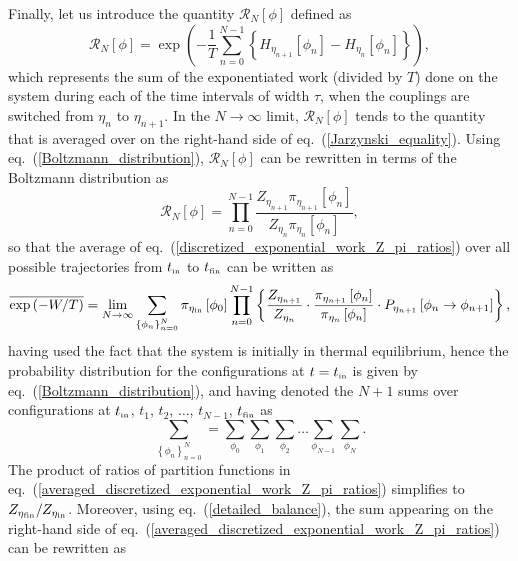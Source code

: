 \documentclass[11pt]{article}
\newcommand{\etain}{\eta_{\mbox{\tiny{in}}}}
\newcommand{\etafin}{\eta_{\mbox{\tiny{fin}}}}
\newcommand{\tin}{t_{\mbox{\tiny{in}}}}
\newcommand{\tfin}{t_{\mbox{\tiny{fin}}}}
\begin{document}
Finally, let us introduce the quantity $\mathcal{R}_N[\phi]$ defined as
\begin{equation}
\label{discretized_exponential_work}
\mathcal{R}_N[\phi] = \exp \left( - \frac{1}{T}\sum_{n=0}^{N-1} \left\{ H_{\eta_{n+1}}\left[\phi_n\right] - H_{\eta_n}\left[\phi_n\right] \right\}\right),
\end{equation}
which represents the sum of the exponentiated work (divided by $T$) done on the system during each of the time intervals of width $\tau$, when the couplings are switched from $\eta_n$ to $\eta_{n+1}$. In the $N \to \infty$ limit, $\mathcal{R}_N[\phi]$ tends to the quantity that is averaged over on the right-hand side of eq.~(\ref{Jarzynski_equality}). Using eq.~(\ref{Boltzmann_distribution}), $\mathcal{R}_N[\phi]$ can be rewritten in terms of the Boltzmann distribution as
\begin{equation}
\label{discretized_exponential_work_Z_pi_ratios}
\mathcal{R}_N[\phi] = \prod_{n=0}^{N-1} \frac{Z_{\eta_{n+1}} \pi_{\eta_{n+1}}\left[\phi_n \right]}{Z_{\eta_n} \pi_{\eta_n}\left[\phi_n \right]},
\end{equation}
so that the average of eq.~(\ref{discretized_exponential_work_Z_pi_ratios}) over all possible trajectories from $\tin$ to $\tfin$ can be written as
\begin{equation}
\label{averaged_discretized_exponential_work_Z_pi_ratios}
\overline{\exp \left( -W/T \right)} = \lim_{N \to \infty} \sum_{\left\{ \phi_n \right\}_{n=0}^N }\pi_{\etain}\left[ \phi_0 \right] \prod_{n=0}^{N-1} \left\{ \frac{Z_{\eta_{n+1}}}{Z_{\eta_n}} \cdot \frac{\pi_{\eta_{n+1}}\left[\phi_n\right]}{\pi_{\eta_n}\left[\phi_n\right]} \cdot P_{\eta_{n+1}}\left[ \phi_n \to \phi_{n+1} \right] \right\},
\end{equation}
having used the fact that the system is initially in thermal equilibrium, hence the probability distribution for the configurations at $t=\tin$ is given by eq.~(\ref{Boltzmann_distribution}), and having denoted the $N+1$ sums over configurations at $\tin$, $t_1$, $t_2$, $\dots$, $t_{N-1}$, $\tfin$ as
\begin{equation}
\sum_{\left\{ \phi_n \right\}_{n=0}^N } = \sum_{\phi_0} \sum_{\phi_1}  \sum_{\phi_2} \dots \sum_{\phi_{N-1}} \sum_{\phi_N}.
\end{equation}
The product of ratios of partition functions in eq.~(\ref{averaged_discretized_exponential_work_Z_pi_ratios}) simplifies to $Z_{\etafin}/Z_{\etain}$. Moreover, using eq.~(\ref{detailed_balance}), the sum appearing on the right-hand side of eq.~(\ref{averaged_discretized_exponential_work_Z_pi_ratios}) can be rewritten as
\end{document}
